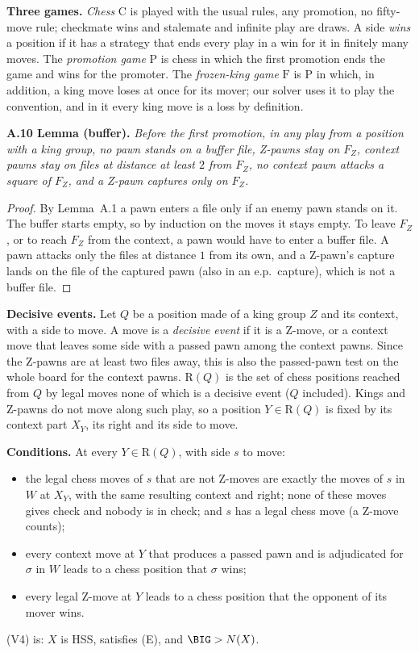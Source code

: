 \textbf{Three games.} \emph{Chess} $\mathrm{C}$ is played with the usual rules, any promotion, no fifty-move rule;
checkmate wins and stalemate and infinite play are draws. A side \emph{wins} a position if it has a strategy that ends every
play in a win for it in finitely many moves. The \emph{promotion game} $\mathrm{P}$ is chess in which the first promotion
ends the game and wins for the promoter. The \emph{frozen-king game} $\mathrm{F}$ is $\mathrm{P}$ in which, in addition,
a king move loses at once for its mover; our solver uses it to play the convention, and in it every king move is a loss by
definition.

\textbf{A.10 Lemma (buffer).} \emph{Before the first promotion, in any play from a position with a king group, no pawn
stands on a buffer file, Z-pawns stay on $F_Z$, context pawns stay on files at distance at least $2$ from $F_Z$, no context
pawn attacks a square of $F_Z$, and a Z-pawn captures only on $F_Z$.}

\begin{proof}
By Lemma~A.1 a pawn enters a file only if an enemy pawn stands on it. The buffer starts empty, so by induction on the moves
it stays empty. To leave $F_Z$, or to reach $F_Z$ from the context, a pawn would have to enter a buffer file. A pawn
attacks only the files at distance $1$ from its own, and a Z-pawn's capture lands on the file of the captured pawn (also in an e.p.\ capture), which is not a buffer file.
\end{proof}

\textbf{Decisive events.} Let $Q$ be a position made of a king group $Z$ and its context, with a side to move. A move is a
\emph{decisive event} if it is a Z-move, or a context move that leaves some side with a passed
pawn among the context pawns. Since the Z-pawns are at least two files away, this is also the passed-pawn test on the whole
board for the context pawns. $\mathrm{R}(Q)$ is the set of chess positions reached from $Q$ by legal moves none of which is
a decisive event ($Q$ included). Kings and Z-pawns do not move along such play, so a position $Y\in\mathrm{R}(Q)$ is fixed
by its context part $X_Y$, its right and its side to move.

\textbf{Conditions.} At every $Y\in\mathrm{R}(Q)$, with side $s$ to move:
\begin{itemize}
\item[(V1)] the legal chess moves of $s$ that are not Z-moves are exactly the moves of $s$ in $W$ at $X_Y$, with the same
resulting context and right; none of these moves gives check and nobody is in check; and $s$ has a legal chess move (a Z-move counts);
\item[(V2)] every context move at $Y$ that produces a passed pawn and is adjudicated for $\sigma$ in $W$ leads to a chess position that $\sigma$ wins;
\item[(V3)] every legal Z-move at $Y$ leads to a chess position that the opponent of its mover wins.
\end{itemize}
(V4) is: $X$ is HSS, satisfies (E), and $\BIG>N(X)$.

